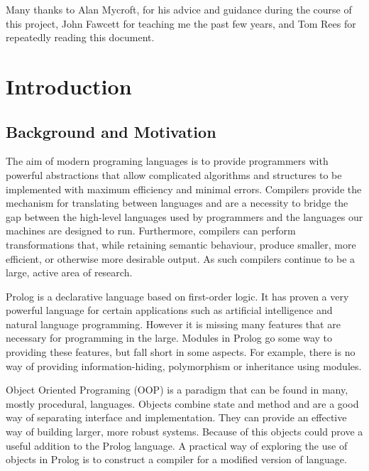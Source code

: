 \documentclass[12pt,a4paper,twoside,openright]{report}
\begin{document}
Many thanks to Alan Mycroft, for his advice and guidance during the course of this project, John Fawcett for teaching me the past few years, and Tom Rees for repeatedly reading this document.


\pagestyle{headings}

\chapter{Introduction}

\section{Background and Motivation}

The aim of modern programing languages is to provide programmers with powerful abstractions that allow complicated algorithms and structures to be implemented with maximum efficiency and minimal errors. Compilers provide the mechanism for translating between languages and are a necessity to bridge the gap between the high-level languages used by programmers and the languages our machines are designed to run. Furthermore, compilers can perform transformations that, while retaining semantic behaviour, produce smaller, more efficient, or otherwise more desirable output. As such compilers continue to be a large, active area of research.

\bigskip

Prolog is a declarative language based on first-order logic. It has proven a very powerful language for certain applications such as artificial intelligence\cite{AIBOOK} and natural language programming\cite{NLPBOOK}. However it is missing many features that are necessary for programming in the large. Modules in Prolog go some way to providing these features, but fall short in some aspects. For example, there is no way of providing information-hiding, polymorphism or inheritance using modules.

\bigskip

Object Oriented Programing (OOP) is a paradigm that can be found in many, mostly procedural, languages. Objects combine state and method and are a good way of separating interface and implementation. They can provide an effective way of building larger, more robust systems. Because of this objects could prove a useful addition to the Prolog language. A practical way of exploring the use of objects in Prolog is to construct a compiler for a modified version of language.
\end{document}
